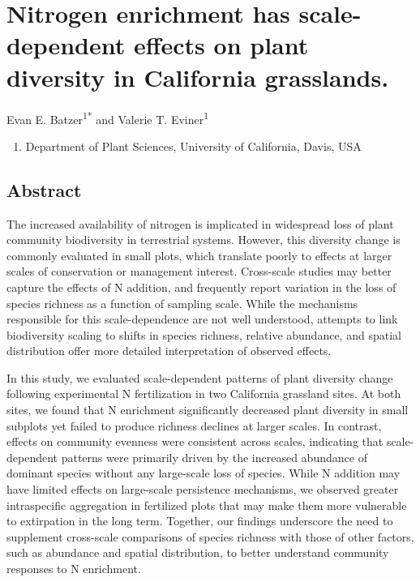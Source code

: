 \documentclass[twoside,12pt,final]{ucthesis-CA2012}
\providecommand{\tightlist}{%
  \setlength{\itemsep}{0pt}\setlength{\parskip}{0pt}}
\begin{document}
\begin{ucmainmatter}
\hypertarget{nitrogen-enrichment-has-scale-dependent-effects-on-plant-diversity-in-california-grasslands.}{%
\chapter{Nitrogen enrichment has scale-dependent effects on plant diversity in California grasslands.}\label{nitrogen-enrichment-has-scale-dependent-effects-on-plant-diversity-in-california-grasslands.}}


Evan E. Batzer\textsuperscript{1*} and Valerie T. Eviner\textsuperscript{1}
\begin{enumerate}
\def\labelenumi{\arabic{enumi}.}
\tightlist
\item
  Department of Plant Sciences, University of California, Davis, USA
\end{enumerate}
\hypertarget{abstract}{%
\section{Abstract}\label{abstract}}

The increased availability of nitrogen is implicated in widespread loss of plant community biodiversity in terrestrial systems. However, this diversity change is commonly evaluated in small plots, which translate poorly to effects at larger scales of conservation or management interest. Cross-scale studies may better capture the effects of N addition, and frequently report variation in the loss of species richness as a function of sampling scale. While the mechanisms responsible for this scale-dependence are not well understood, attempts to link biodiversity scaling to shifts in species richness, relative abundance, and spatial distribution offer more detailed interpretation of observed effects.

In this study, we evaluated scale-dependent patterns of plant diversity change following experimental N fertilization in two California grassland sites. At both sites, we found that N enrichment significantly decreased plant diversity in small subplots yet failed to produce richness declines at larger scales. In contrast, effects on community evenness were consistent across scales, indicating that scale-dependent patterns were primarily driven by the increased abundance of dominant species without any large-scale loss of species. While N addition may have limited effects on large-scale persistence mechanisms, we observed greater intraspecific aggregation in fertilized plots that may make them more vulnerable to extirpation in the long term. Together, our findings underscore the need to supplement cross-scale comparisons of species richness with those of other factors, such as abundance and spatial distribution, to better understand community responses to N enrichment.


\end{ucmainmatter}
\end{document}
